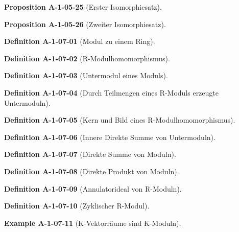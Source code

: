 \documentclass[10pt, letterpaper]{article}
\newcommand{\CustomHeading}[3]{%
  \par\medskip\noindent%
  \textbf{#1 #2} \textnormal{(#3)}.\enskip%
}
\newenvironment{DEF}[2]{\CustomHeading{Definition}{#1}{#2}}{}
\newenvironment{PROP}[2]{\CustomHeading{Proposition}{#1}{#2}}{}
\newenvironment{EXA}[2]{\CustomHeading{Example}{#1}{#2}}{}
\begin{document}
\begin{PROP}{A-1-05-25}{Erster Isomorphiesatz}
\end{PROP}

\begin{PROP}{A-1-05-26}{Zweiter Isomorphiesatz}
\end{PROP}

\begin{DEF}{A-1-07-01}{Modul zu einem Ring}
\end{DEF}

\begin{DEF}{A-1-07-02}{R-Modulhomomorphismus}
\end{DEF}

\begin{DEF}{A-1-07-03}{Untermodul eines Moduls}
\end{DEF}

\begin{DEF}{A-1-07-04}{Durch Teilmengen eines R-Moduls erzeugte Untermoduln}
\end{DEF}

\begin{DEF}{A-1-07-05}{Kern und Bild eines R-Modulhomomorphismus}
\end{DEF}

\begin{DEF}{A-1-07-06}{Innere Direkte Summe von Untermoduln}
\end{DEF}

\begin{DEF}{A-1-07-07}{Direkte Summe von Moduln}
\end{DEF}

\begin{DEF}{A-1-07-08}{Direkte Produkt von Moduln}
\end{DEF}

\begin{DEF}{A-1-07-09}{Annulatorideal von R-Moduln}
\end{DEF}

\begin{DEF}{A-1-07-10}{Zyklischer R-Modul}
\end{DEF}

\begin{EXA}{A-1-07-11}{K-Vektorräume sind K-Moduln}
\end{EXA}
\end{document}
